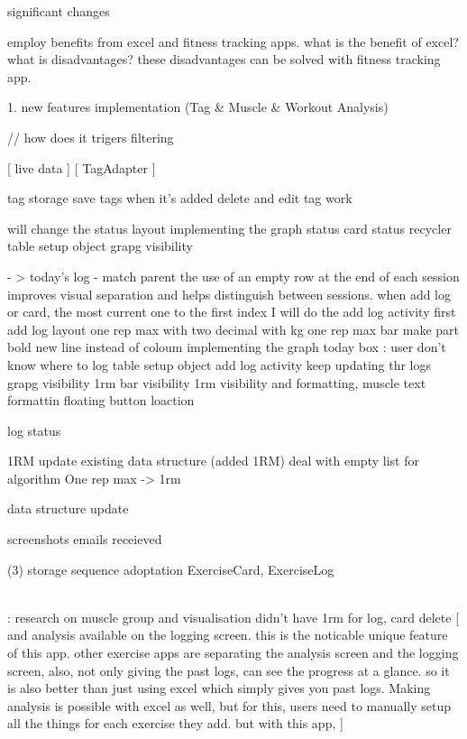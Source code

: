
significant changes 

employ benefits from excel and fitness tracking apps.
what is the benefit of excel?
what is disadvantages?
these disadvantages can be solved with fitness tracking app. 

1. new features implementation (Tag & Muscle & Workout Analysis)




// how does it trigers filtering

[ live data ]
[ TagAdapter ]


\model
tag storage
save tags when it's added
delete and edit tag work

will change the status layout
implementing the graph
status card
status recycler
table setup object
grapg visibility

- > today's log - match parent
the use of an empty row at the end of each session improves visual separation and helps distinguish between sessions.
when add log or card, the most current one to the first index
I will do the add log activity first
add log layout
one rep max with two decimal with kg
one rep max bar
make part bold
new line instead of coloum
implementing the graph
today box : user don't know where to log
table setup object
add log activity keep updating thr logs
grapg visibility
1rm bar visibility
1rm visibility and formatting, muscle text formattin
floating button loaction


log 
status

\predicted 1RM
update existing data structure (added 1RM)
deal with empty list for algorithm
One rep max -> 1rm

data structure update



screenshots 
emails receieved

(3) storage sequence adoptation 
    ExerciseCard, ExerciseLog






\\ : 
research on muscle group and visualisation
didn't have 1rm for log, card
delete [
    and analysis available on the logging screen. 
this is the noticable unique feature of this app. 
other exercise apps are separating the analysis screen and the logging screen, 
also, not only giving the past logs, can see the progress at a glance. 
so it is also better than just using excel which simply gives you past logs.
Making analysis is possible with excel as well, but for this, users need to manually setup all the things for each exercise they add.
but with this app, 
]


